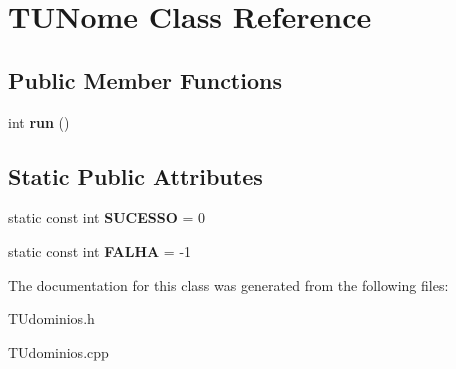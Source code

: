 \hypertarget{classTUNome}{}\section{T\+U\+Nome Class Reference}
\label{classTUNome}
\subsection*{Public Member Functions}
\begin{DoxyCompactItemize}
\item 
\mbox{\label{classTUNome_ae20734cb15f71890e57aff02a00f6313}} 
int {\bfseries run} ()
\end{DoxyCompactItemize}
\subsection*{Static Public Attributes}
\begin{DoxyCompactItemize}
\item 
\mbox{\label{classTUNome_af1d3faa5a4f6a302f96d193478f3013b}} 
static const int {\bfseries S\+U\+C\+E\+S\+SO} = 0
\item 
\mbox{\label{classTUNome_a50bf8928bc5e773eaf15a2fb5eb2f065}} 
static const int {\bfseries F\+A\+L\+HA} = -\/1
\end{DoxyCompactItemize}


The documentation for this class was generated from the following files\+:\begin{DoxyCompactItemize}
\item 
T\+Udominios.\+h\item 
T\+Udominios.\+cpp\end{DoxyCompactItemize}
